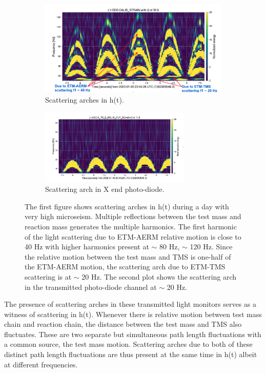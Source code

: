 \documentclass[12pt]{iopart}
\begin{document}
\begin{figure}[h]
   \centering
    \begin{subfigure}[b]{0.45\textwidth}
        \centering
         \includegraphics[width= \textwidth]{1262389546darmnew2.png}
         \caption{Scattering arches in h(t).}
         \label{fig:1262darm}
    \end{subfigure}
    \begin{subfigure}[b]{0.45\textwidth}
        \centering
         \includegraphics[width =\textwidth,height=3.6cm]{1262389546transnnew2.png}
         \caption{Scattering arch in X end photo-diode.}
         \label{fig:1262trans}
         
    
    \end{subfigure}
    \caption{The first figure shows scattering arches in h(t) during a day with very high microseism. Multiple reflections between the test mass and reaction mass generates the multiple harmonics. The first harmonic of the light scattering due to ETM-AERM relative motion is close to 40 Hz with higher harmonics present at $\sim$ 80 Hz, $\sim$ 120 Hz. Since the relative motion between the test mass and TMS is one-half of the ETM-AERM motion, the scattering arch due to ETM-TMS scattering is at $\sim$ 20 Hz. The second plot shows the scattering arch in the transmitted photo-diode channel at $\sim$ 20 Hz.}
    \label{fig:1262scat}
    
\end{figure}
The presence of scattering arches in these transmitted light monitors serves as a witness of scattering in h(t). Whenever there is relative motion between test mass chain and reaction chain, the distance between the test mass and TMS also fluctuates. These are two separate but simultaneous path length fluctuations with a common source, the test mass motion. Scattering arches due to both of these distinct path length fluctuations are thus present at the same time in h(t) albeit at different frequencies.
\end{document}
